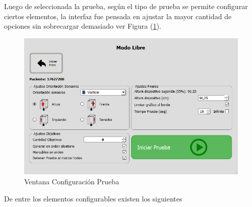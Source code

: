 \documentclass[12pt,a4paper]{article}
\begin{document}
Luego de seleccionada la prueba, según el tipo de prueba se permite configurar ciertos elementos, la interfaz fue pensada en ajustar la mayor cantidad de opciones sin sobrecargar demasiado ver Figura (\ref{fig:configurarPrueba}).

\begin{figure}[H]
	\centering
	\includegraphics[scale=0.6]{images/configurarPrueba}
	\caption{Ventana Configuración Prueba}
	\label{fig:configurarPrueba}
\end{figure}

De entre los elementos configurables existen los siguientes
\end{document}
